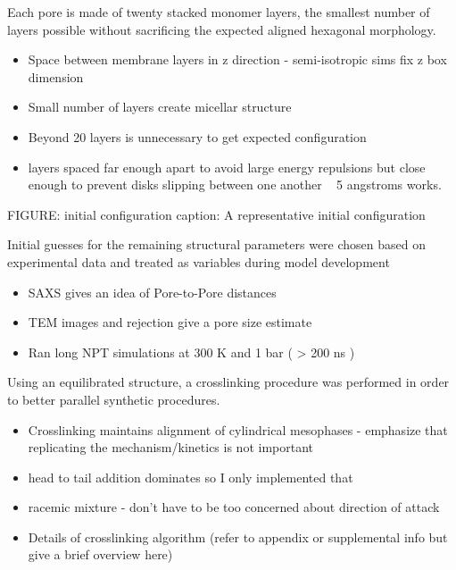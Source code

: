 \documentclass{article}
\begin{document}
	Each pore is made of twenty stacked monomer layers, the smallest number of layers possible without sacrificing the expected aligned hexagonal morphology.
	\begin{itemize}
		\item Space between membrane layers in z direction - semi-isotropic sims fix z box dimension
		\item Small number of layers create micellar structure
		\item Beyond 20 layers is unnecessary to get expected configuration
		\item layers spaced far enough apart to avoid large energy repulsions but close enough to prevent disks slipping between one another ~ 5 angstroms works.
	\end{itemize}
	FIGURE: initial configuration
	caption: A representative initial configuration

	\noindent Initial guesses for the remaining structural parameters were chosen based on experimental data and treated as variables during model development 
	\begin{itemize}
		\item SAXS gives an idea of Pore-to-Pore distances
		\item TEM images and rejection give a pore size estimate
		\item Ran long NPT simulations at 300 K and 1 bar ( > 200 ns )
	\end{itemize}
	
	Using an equilibrated structure, a crosslinking procedure was performed in order to better parallel synthetic procedures. 
	\begin{itemize}
		\item Crosslinking maintains alignment of cylindrical mesophases - emphasize that replicating the mechanism/kinetics is not important 
		\item head to tail addition dominates so I only implemented that
		\item racemic mixture - don't have to be too concerned about direction of attack 
		\item Details of crosslinking algorithm (refer to appendix or supplemental info but give a brief overview here)
	\end{itemize}  
	
\end{document}
